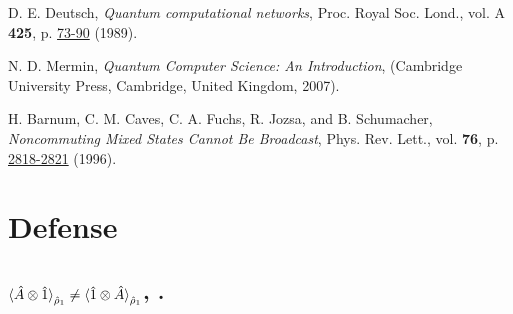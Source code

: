 \documentclass[11pt]{article}
\numberwithin{equation}{section} %
\numberwithin{figure}{section} %
\begin{document}
\begin{thebibliography}{X}


 D. E. Deutsch, {\it Quantum computational networks}, Proc. Royal Soc. Lond., vol. A {\bf 425}, p. \href{https://royalsocietypublishing.org/doi/abs/10.1098/rspa.1989.0099}{73-90} (1989).

 N. D. Mermin, {\it Quantum Computer Science: An Introduction},  (Cambridge University Press, Cambridge, United Kingdom, 2007).

 H. Barnum, C. M. Caves, C. A. Fuchs, R. Jozsa, and B. Schumacher, {\it Noncommuting Mixed States Cannot Be Broadcast}, Phys. Rev. Lett., vol. {\bf 76}, p. \href{https://journals.aps.org/prl/abstract/10.1103/PhysRevLett.76.2818}{2818-2821} (1996).






\end{thebibliography}




\newpage
\section{Defense }

\subsection{$\braket{ \hat{A}\otimes \hat{1}}_{\hat{\rho}_1} \neq \braket{\hat{1}\otimes\hat{A}}_{\hat{\rho}_1}$, .}
\end{document}
